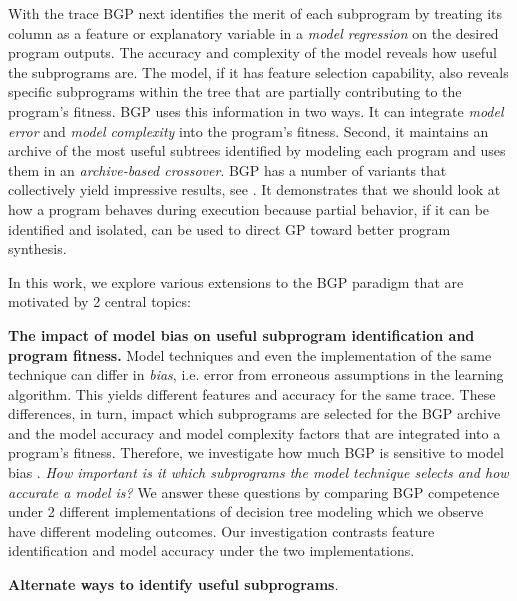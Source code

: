 With the trace BGP next identifies the merit of each subprogram by treating its column as a feature or explanatory variable in a \textit{model regression} on the desired program outputs.  The accuracy and complexity of the model reveals how useful the subprograms are. The model, if it has feature selection capability, also reveals  specific subprograms within the tree that are partially contributing to the program's fitness.  BGP uses this information in two ways. It can integrate \textit{model error }and \textit{model complexity} into the program's fitness. Second, it maintains an archive of the most useful subtrees identified by modeling each program and uses them in an \textit{archive-based crossover}. BGP has a number of variants that collectively yield impressive results, see \cite{KrawiecGECCO2014,KrawiecBPS2016}. It demonstrates that we should look at how a program behaves during execution because partial behavior, if it can be identified and isolated, can be used to direct GP toward better program synthesis. 

In this work,  we explore various extensions to the BGP paradigm that are motivated by 2 central topics: \begin{inparaenum}\item \textbf{The impact of model bias on useful subprogram identification and program fitness.}  Model techniques and even the implementation of the same technique can differ in  \textit{bias}, i.e. error from erroneous assumptions in the learning algorithm. This yields different features and accuracy for the same trace. These differences, in turn, impact which subprograms are selected for the BGP archive and the model accuracy and model complexity factors that are integrated into a program's fitness. Therefore, we investigate how much BGP is sensitive to model bias . %
\textit{How important is it which subprograms the model technique selects and how accurate a model is? }  We answer these questions by comparing BGP competence under 2 different implementations of decision tree modeling which we observe have different modeling outcomes. Our investigation contrasts feature identification and model accuracy under the two implementations. \item \textbf{Alternate ways to identify useful subprograms}.  \end{inparaenum}

